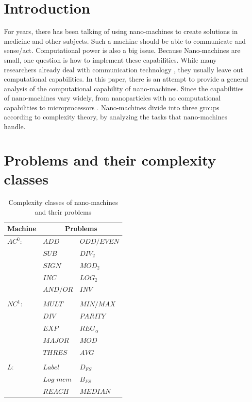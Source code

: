\documentclass[10pt,sigconf]{acmart}
\begin{document}
\maketitle

\section{Introduction}
For years, there has been talking of using nano-machines to create solutions in medicine and other subjects. Such a machine should be able to communicate and sense/act. Computational power is also a big issue.
Because Nano-machines are small, one question is how to implement these capabilities. 
While many researchers already deal with communication technology \cite{akyildiz2008nanonetworks}, they usually leave out computational capabilities.
In this paper, there is an attempt to provide a general analysis of the computational capability of nano-machines.
Since the capabilities of nano-machines vary widely, from nanoparticles with no computational capabilities to microprocessors \cite{cobo2010bacteria}. Nano-machines divide into three groups according to complexity theory,
by analyzing the tasks that nano-machines handle.



\section{Problems and their complexity classes}
\begin{table}[h!]
  \begin{tabular}{ p{1.5cm}|p{2cm} p{2cm}}
    \hline
    Machine & \multicolumn{2}{c}{Problems} \\
    \hline
    $AC^0$: & $ADD$ & $ODD/EVEN$  \\
            & $SUB$ & $DIV_{2}$  \\
            & $SIGN$ & $MOD_{2}$  \\
            & $INC$ & $LOG_{2}$  \\
            & $AND/OR$ & $INV$  \\
            &  &   \\
    $NC^1$:   & $MULT$ &$MIN/MAX$    \\
             & $DIV$ & $PARITY$  \\
             & $EXP$ & $REG_{\alpha}$  \\
             & $MAJOR$ & $MOD$  \\
             & $THRES$ & $AVG$  \\
             &  &   \\
    $L$:      &   $Label$ &$D_{FS}$      \\
             & $Log$ $mem$ & $B_{FS}$  \\
             & $REACH$ & $MEDIAN$  \\
            
    \hline 
  \end{tabular}\\
    
  \caption{Complexity classes of nano-machines and their problems}
  \label{table1}
\end{table}
\end{document}
